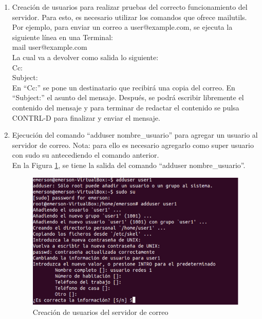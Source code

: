 \begin{enumerate}
    \item Creación de usuarios para realizar pruebas del correcto funcionamiento del servidor. Para esto, es necesario utilizar los comandos que ofrece mailutils.\\
    
    \noindent
    Por ejemplo, para enviar un correo a user@example.com, se ejecuta la siguiente línea en una Terminal:\\
    
    \noindent
    mail user@example.com\\
    
    \noindent
    La cual va a devolver como salida lo siguiente:\\
    
    \noindent
    Cc:\\
    \noindent
    Subject:\\
    
    \noindent
    En “Cc:” se pone un destinatario que recibirá una copia del correo. En “Subject:” el asunto del mensaje. Después, se podrá escribir libremente el contenido del mensaje y para terminar de redactar el contenido se pulsa CONTRL-D para finalizar y enviar el mensaje.
    
    \item Ejecución del comando “adduser nombre\_usuario” para agregar un usuario al servidor de correo. Nota: para ello es necesario agregarlo como super usuario con sudo su antecediendo el comando anterior.\\
    
     En la Figura \ref{fig:smtp7}, se tiene la salida del comando ``adduser nombre\_usuario''.
    
    \begin{figure}[H]
        \centering
        \includegraphics[scale=.85]{imagenes/primero/paso7_smtp.PNG}
        \caption{Creación de usuarios del servidor de correo}
        \label{fig:smtp7}
    \end{figure}
    

\end{enumerate}

